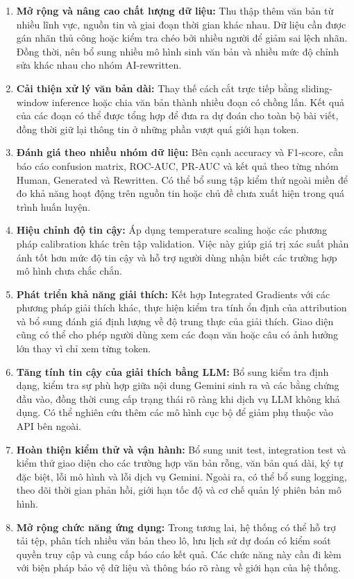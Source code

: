 \begin{enumerate}
    \item \textbf{Mở rộng và nâng cao chất lượng dữ liệu:} Thu thập thêm văn bản từ nhiều lĩnh vực, nguồn tin và giai đoạn thời gian khác nhau. Dữ liệu cần được gán nhãn thủ công hoặc kiểm tra chéo bởi nhiều người để giảm sai lệch nhãn. Đồng thời, nên bổ sung nhiều mô hình sinh văn bản và nhiều mức độ chỉnh sửa khác nhau cho nhóm AI-rewritten.
    \item \textbf{Cải thiện xử lý văn bản dài:} Thay thế cách cắt trực tiếp bằng sliding-window inference hoặc chia văn bản thành nhiều đoạn có chồng lấn. Kết quả của các đoạn có thể được tổng hợp để đưa ra dự đoán cho toàn bộ bài viết, đồng thời giữ lại thông tin ở những phần vượt quá giới hạn token.
    \item \textbf{Đánh giá theo nhiều nhóm dữ liệu:} Bên cạnh accuracy và F1-score, cần báo cáo confusion matrix, ROC-AUC, PR-AUC và kết quả theo từng nhóm Human, Generated và Rewritten. Có thể bổ sung tập kiểm thử ngoài miền để đo khả năng hoạt động trên nguồn tin hoặc chủ đề chưa xuất hiện trong quá trình huấn luyện.
    \item \textbf{Hiệu chỉnh độ tin cậy:} Áp dụng temperature scaling hoặc các phương pháp calibration khác trên tập validation. Việc này giúp giá trị xác suất phản ánh tốt hơn mức độ tin cậy và hỗ trợ người dùng nhận biết các trường hợp mô hình chưa chắc chắn.
    \item \textbf{Phát triển khả năng giải thích:} Kết hợp Integrated Gradients với các phương pháp giải thích khác, thực hiện kiểm tra tính ổn định của attribution và bổ sung đánh giá định lượng về độ trung thực của giải thích. Giao diện cũng có thể cho phép người dùng xem các đoạn văn hoặc câu có ảnh hưởng lớn thay vì chỉ xem từng token.
    \item \textbf{Tăng tính tin cậy của giải thích bằng LLM:} Bổ sung kiểm tra định dạng, kiểm tra sự phù hợp giữa nội dung Gemini sinh ra và các bằng chứng đầu vào, đồng thời cung cấp trạng thái rõ ràng khi dịch vụ LLM không khả dụng. Có thể nghiên cứu thêm các mô hình cục bộ để giảm phụ thuộc vào API bên ngoài.
    \item \textbf{Hoàn thiện kiểm thử và vận hành:} Bổ sung unit test, integration test và kiểm thử giao diện cho các trường hợp văn bản rỗng, văn bản quá dài, ký tự đặc biệt, lỗi mô hình và lỗi dịch vụ Gemini. Ngoài ra, có thể bổ sung logging, theo dõi thời gian phản hồi, giới hạn tốc độ và cơ chế quản lý phiên bản mô hình.
    \item \textbf{Mở rộng chức năng ứng dụng:} Trong tương lai, hệ thống có thể hỗ trợ tải tệp, phân tích nhiều văn bản theo lô, lưu lịch sử dự đoán có kiểm soát quyền truy cập và cung cấp báo cáo kết quả. Các chức năng này cần đi kèm với biện pháp bảo vệ dữ liệu và thông báo rõ ràng về giới hạn của hệ thống.
\end{enumerate}

